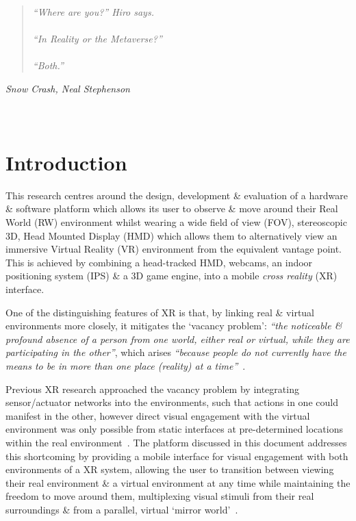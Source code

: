 \begin{quote}
\textit{``Where are you?'' Hiro says.
\\
\\
``In Reality or the Metaverse?''
\\
\\
``Both.''}
\end{quote}
\hfill \textit{Snow Crash, Neal Stephenson}
\\
\\
\\



\section{Introduction}
This research centres around the design, development \& evaluation of a hardware \& software platform which allows its user to observe \& move around their Real World (RW) environment whilst wearing a wide field of view (FOV), stereoscopic 3D, Head Mounted Display (HMD) which allows them to alternatively view an immersive Virtual Reality (VR) environment from the equivalent vantage point. This is achieved by combining a head-tracked HMD, webcams, an indoor positioning system (IPS) \& a 3D game engine, into a mobile \textit{cross reality} (XR) interface.

One of the distinguishing features of XR is that, by linking real \& virtual environments more closely, it mitigates the `vacancy problem': \textit{``the noticeable \& profound absence of a person from one world, either real or virtual, while they are participating in the other''}, which arises \textit{``because people do not currently have the means to be in more than one place (reality) at a time''}~\cite{Lifton2007a}.

Previous XR research approached the vacancy problem by integrating sensor/actuator networks into the environments, such that actions in one could manifest in the other, however direct visual engagement with the virtual environment was only possible from static interfaces at pre-determined locations within the real environment~\cite{Lifton2007a, Dublon2011}. The platform discussed in this document addresses this shortcoming by providing a mobile interface for visual engagement with both environments of a XR system, allowing the user to transition between viewing their real environment \& a virtual environment at any time while maintaining the freedom to move around them, multiplexing visual stimuli from their real surroundings \& from a parallel, virtual `mirror world'~\cite{Gelernter1993}.

